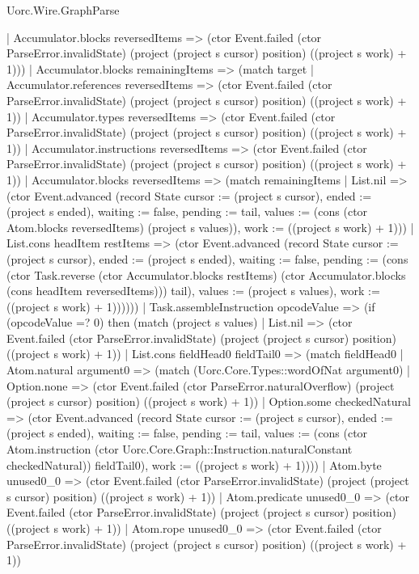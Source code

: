 \begin{lexlean}{Uorc.Wire.GraphParse}
\begin{semanticmodule}
{          | Accumulator.blocks reversedItems => (ctor Event.failed (ctor ParseError.invalidState) (project (project s cursor) position) ((project s work) + 1)))
        | Accumulator.blocks remainingItems => (match target
          | Accumulator.references reversedItems => (ctor Event.failed (ctor ParseError.invalidState) (project (project s cursor) position) ((project s work) + 1))
          | Accumulator.types reversedItems => (ctor Event.failed (ctor ParseError.invalidState) (project (project s cursor) position) ((project s work) + 1))
          | Accumulator.instructions reversedItems => (ctor Event.failed (ctor ParseError.invalidState) (project (project s cursor) position) ((project s work) + 1))
          | Accumulator.blocks reversedItems => (match remainingItems
            | List.nil => (ctor Event.advanced (record State {cursor := (project s cursor), ended := (project s ended), waiting := false, pending := tail, values := (cons (ctor Atom.blocks reversedItems) (project s values)), work := ((project s work) + 1)}))
            | List.cons headItem restItems => (ctor Event.advanced (record State {cursor := (project s cursor), ended := (project s ended), waiting := false, pending := (cons (ctor Task.reverse (ctor Accumulator.blocks restItems) (ctor Accumulator.blocks (cons headItem reversedItems))) tail), values := (project s values), work := ((project s work) + 1)})))))
      | Task.assembleInstruction opcodeValue => (if (opcodeValue =? 0) then (match (project s values)
        | List.nil => (ctor Event.failed (ctor ParseError.invalidState) (project (project s cursor) position) ((project s work) + 1))
        | List.cons fieldHead0 fieldTail0 => (match fieldHead0
          | Atom.natural argument0 => (match (Uorc.Core.Types::wordOfNat argument0)
            | Option.none => (ctor Event.failed (ctor ParseError.naturalOverflow) (project (project s cursor) position) ((project s work) + 1))
            | Option.some checkedNatural => (ctor Event.advanced (record State {cursor := (project s cursor), ended := (project s ended), waiting := false, pending := tail, values := (cons (ctor Atom.instruction (ctor Uorc.Core.Graph::Instruction.naturalConstant checkedNatural)) fieldTail0), work := ((project s work) + 1)})))
          | Atom.byte unused0_0 => (ctor Event.failed (ctor ParseError.invalidState) (project (project s cursor) position) ((project s work) + 1))
          | Atom.predicate unused0_0 => (ctor Event.failed (ctor ParseError.invalidState) (project (project s cursor) position) ((project s work) + 1))
          | Atom.rope unused0_0 => (ctor Event.failed (ctor ParseError.invalidState) (project (project s cursor) position) ((project s work) + 1))
}
\end{semanticmodule}
\end{lexlean}
